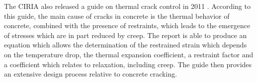 \documentclass{report}
\begin{document}
The CIRIA also released a guide on thermal crack control in 2011 \cite{ciria}.
According to this guide, the main cause of cracks in concrete is the thermal
behavior of concrete, combined with the presence of restraints, which leads to
the emergence of stresses which are in part reduced by creep. The report is
able to produce an equation which allows the determination of the restrained
strain which depends on the temperature drop, the thermal expansion
coefficient, a restraint factor and a coefficient which relates to relaxation,
including creep. The guide then provides an extensive design process relative
to concrete cracking.


\nocite{*}
\printbibliography
\end{document}
